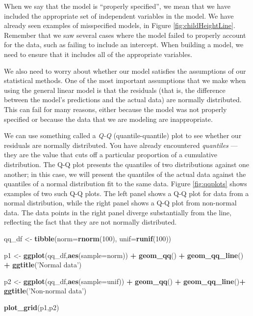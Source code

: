 \documentclass[12pt,]{book}
\newenvironment{Shaded}{\begin{snugshade}}{\end{snugshade}}
\newcommand{\DataTypeTok}[1]{\textcolor[rgb]{0.13,0.29,0.53}{#1}}
\newcommand{\DecValTok}[1]{\textcolor[rgb]{0.00,0.00,0.81}{#1}}
\newcommand{\KeywordTok}[1]{\textcolor[rgb]{0.13,0.29,0.53}{\textbf{#1}}}
\newcommand{\NormalTok}[1]{#1}
\newcommand{\OperatorTok}[1]{\textcolor[rgb]{0.81,0.36,0.00}{\textbf{#1}}}
\newcommand{\StringTok}[1]{\textcolor[rgb]{0.31,0.60,0.02}{#1}}
\theoremstyle{definition}
\theoremstyle{definition}
\theoremstyle{definition}
\theoremstyle{remark}
\begin{document}
When we say that the model is ``properly specified'', we mean that we have included the appropriate set of independent variables in the model. We have already seen examples of misspecified models, in Figure \ref{fig:childHeightLine}. Remember that we saw several cases where the model failed to properly account for the data, such as failing to include an intercept. When building a model, we need to ensure that it includes all of the appropriate variables.

We also need to worry about whether our model satisfies the assumptions of our statistical methods. One of the most important assumptions that we make when using the general linear model is that the residuals (that is, the difference between the model's predictions and the actual data) are normally distributed. This can fail for many reasons, either because the model was not properly specified or because the data that we are modeling are inappropriate.

We can use something called a \emph{Q-Q} (quantile-quantile) plot to see whether our residuals are normally distributed. You have already encountered \emph{quantiles} --- they are the value that cuts off a particular proportion of a cumulative distribution. The Q-Q plot presents the quantiles of two distributions against one another; in this case, we will present the quantiles of the actual data against the quantiles of a normal distribution fit to the same data. Figure \ref{fig:qqplots} shows examples of two such Q-Q plots. The left panel shows a Q-Q plot for data from a normal distribution, while the right panel shows a Q-Q plot from non-normal data. The data points in the right panel diverge substantially from the line, reflecting the fact that they are not normally distributed.

\begin{Shaded}
\begin{Highlighting}[]
\NormalTok{qq_df <-}\StringTok{ }\KeywordTok{tibble}\NormalTok{(}\DataTypeTok{norm=}\KeywordTok{rnorm}\NormalTok{(}\DecValTok{100}\NormalTok{),}
                \DataTypeTok{unif=}\KeywordTok{runif}\NormalTok{(}\DecValTok{100}\NormalTok{))}

\NormalTok{p1 <-}\StringTok{ }\KeywordTok{ggplot}\NormalTok{(qq_df,}\KeywordTok{aes}\NormalTok{(}\DataTypeTok{sample=}\NormalTok{norm)) }\OperatorTok{+}\StringTok{ }
\StringTok{  }\KeywordTok{geom_qq}\NormalTok{() }\OperatorTok{+}\StringTok{ }
\StringTok{  }\KeywordTok{geom_qq_line}\NormalTok{() }\OperatorTok{+}\StringTok{ }
\StringTok{  }\KeywordTok{ggtitle}\NormalTok{(}\StringTok{'Normal data'}\NormalTok{)}

\NormalTok{p2 <-}\StringTok{ }\KeywordTok{ggplot}\NormalTok{(qq_df,}\KeywordTok{aes}\NormalTok{(}\DataTypeTok{sample=}\NormalTok{unif)) }\OperatorTok{+}\StringTok{ }
\StringTok{  }\KeywordTok{geom_qq}\NormalTok{() }\OperatorTok{+}\StringTok{ }
\StringTok{  }\KeywordTok{geom_qq_line}\NormalTok{()}\OperatorTok{+}\StringTok{ }
\StringTok{  }\KeywordTok{ggtitle}\NormalTok{(}\StringTok{'Non-normal data'}\NormalTok{)}

\KeywordTok{plot_grid}\NormalTok{(p1,p2)}
\end{Highlighting}
\end{Shaded}
\end{document}
